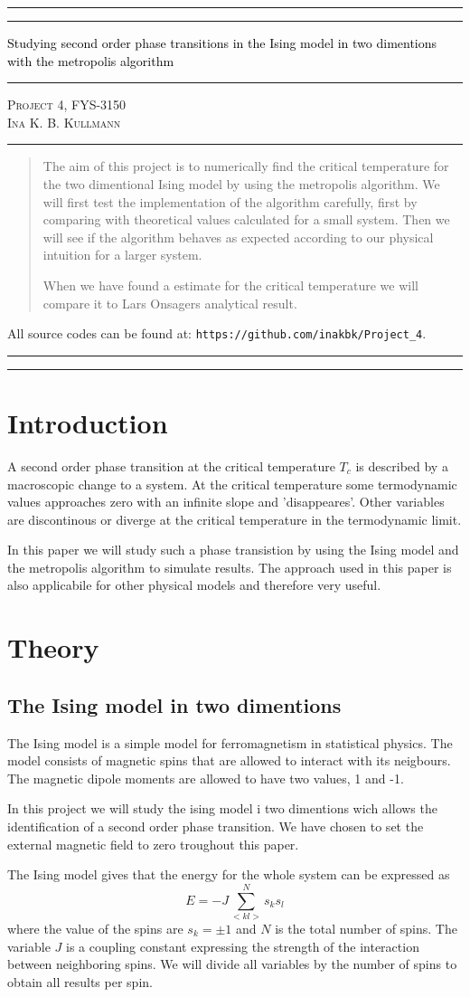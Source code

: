 \documentclass[11pt,a4wide]{article}
\newcommand*{\titleAT}{\begingroup %
\newlength{\drop} %
\drop=0.1\textheight %

\rule{\textwidth}{1pt}\par %
\vspace{2pt}\vspace{-\baselineskip} %
\rule{\textwidth}{0.4pt}\par %

\vspace{0.5\drop} %
\centering %
\textcolor{black}{ %
{\Huge Studying second order phase transitions in the Ising model in two dimentions with the metropolis algorithm}\\[0.75\baselineskip] %
} 

\vspace{0.25\drop} %
\rule{0.3\textwidth}{0.4pt}\par %
\vspace{0.25\drop} %

{\Large \textsc{Project 4, FYS-3150\\[0.75\baselineskip] \normalsize{Ina K. B. Kullmann}
}}\par %


\vspace{0.25\drop} %
\rule{0.3\textwidth}{0.4pt}\par %
\vspace{0.25\drop} %

\begin{abstract}
The aim of this project is to numerically find the critical temperature for the two dimentional Ising model by using the metropolis algorithm. We will first test the implementation of the algorithm carefully, first by comparing with theoretical values calculated for a small system. Then we will see if the algorithm behaves as expected according to our physical intuition for a larger system.

When we have found a estimate for the critical temperature we will compare it to Lars Onsagers analytical result.

\end{abstract}
\vspace*{0.25\drop} %

\begin{center}
{ \scriptsize \noindent All source codes can be found at: \texttt{https://github.com/inakbk/Project\_4}. }
\end{center}

\rule{\textwidth}{0.4pt}\par %
\vspace{2pt}\vspace{-\baselineskip} %
\rule{\textwidth}{1pt}\par %

\endgroup}
\begin{document}
\titleAT %


\newpage
\tableofcontents
\newpage

\section{Introduction}
A second order phase transition at the critical temperature $T_c$ is described by a macroscopic change to a system. At the critical temperature some termodynamic values approaches zero with an infinite slope and 'disappeares'. Other variables are discontinous or diverge at the critical temperature in the termodynamic limit. 

In this paper we will study such a phase transistion by using the Ising model and the metropolis algorithm to simulate results. The approach used in this paper is also applicabile for other physical models and therefore very useful.

\section{Theory}

\subsection{The Ising model in two dimentions}
The Ising model is a simple model for ferromagnetism in statistical physics. The model consists of magnetic spins that are allowed to interact with its neigbours. The magnetic dipole moments are allowed to have two values, 1 and -1.

In this project we will study the ising model i two dimentions wich allows the identification of a second order phase transition. We have chosen to set the external magnetic field to zero troughout this paper.

The Ising model gives that the energy for the whole system can be expressed as
\begin{equation}
  E=-J\sum_{<kl>}^{N}s_ks_l
\end{equation}
where the value of the spins are  $s_k=\pm 1$ and $N$ is the total number of spins. The variable $J$ is a coupling constant expressing the strength of the interaction between neighboring spins. We will divide all variables by the number of spins to obtain all results per spin. 
\end{document}

